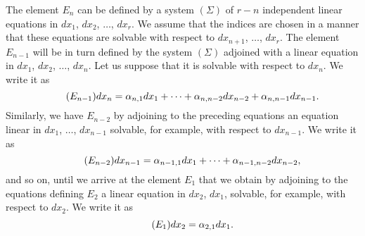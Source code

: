 \documentclass[leqno,11pt]{book}
\theoremstyle{shape1}
\theoremstyle{shapesmall}
\begin{document}
The element $E_{n}$ can be defined by a system $(\Sigma)$ of $r-n$ independent linear equations in $dx_{1}$, $dx_{2}$, $\dots$, $dx_{r}$. We assume that the indices are chosen in a manner that these equations are solvable with respect to $dx_{n+1}$, $\dots$, $dx_{r}$. The element $E_{n-1}$ will be in turn defined by the system $(\Sigma)$ adjoined with a linear equation in $dx_{1}$, $dx_{2}$, $\dots$, $dx_{n}$. Let us suppose that it is solvable with respect to $dx_{n}$. We write it as
\begin{equation}
  \label{eq:En1}\tag{$E_{n-1}$}
  dx_{n}=\alpha_{n,1}dx_{1}+\dots+\alpha_{n,n-2}dx_{n-2}+\alpha_{n,n-1}dx_{n-1}.
\end{equation}
Similarly, we have $E_{n-2}$ by adjoining to the preceding equations an equation linear in $dx_{1}$, $\dots$, $dx_{n-1}$ solvable, for example, with respect to $dx_{n-1}$. We write it as
\begin{equation}
  \label{eq:En2}\tag{$E_{n-2}$}
  dx_{n-1}=\alpha_{n-1,1}dx_{1}+\dots+\alpha_{n-1,n-2}dx_{n-2},
\end{equation}
and so on, until we arrive at the element $E_{1}$ that we obtain by adjoining to the equations defining $E_{2}$ a linear equation in $dx_{2}$, $dx_{1}$, solvable, for example, with respect to $dx_{2}$. We write it as
\begin{equation}
  \label{eq:E1}\tag{$E_{1}$}
  dx_{2}=\alpha_{2,1}dx_{1}.
\end{equation}
\end{document}

